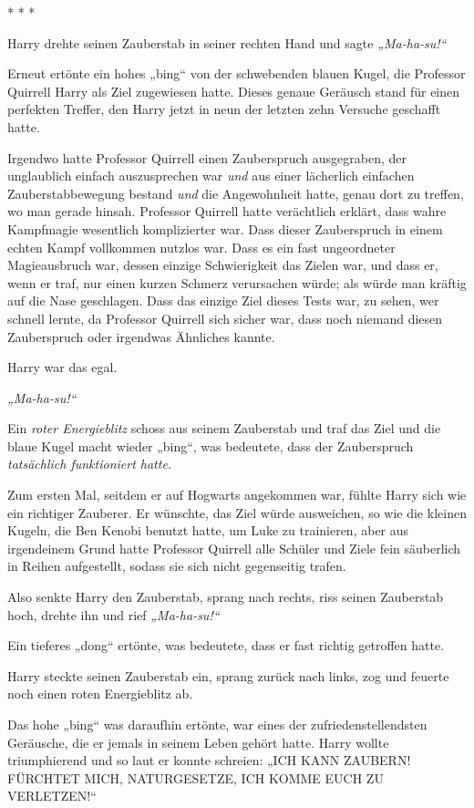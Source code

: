 {* * *

Harry drehte seinen Zauberstab in seiner rechten Hand und sagte \emph{„Ma-ha-su!“}

Erneut ertönte ein hohes „bing“ von der schwebenden blauen Kugel, die Professor Quirrell Harry als Ziel zugewiesen hatte. Dieses genaue Geräusch stand für einen perfekten Treffer, den Harry jetzt in neun der letzten zehn Versuche geschafft hatte.

Irgendwo hatte Professor Quirrell einen Zauberspruch ausgegraben, der unglaublich einfach auszusprechen war \emph{und} aus einer lächerlich einfachen Zauberstabbewegung bestand \emph{und} die Angewohnheit hatte, genau dort zu treffen, wo man gerade hinsah. Professor Quirrell hatte verächtlich erklärt, dass wahre Kampfmagie wesentlich komplizierter war. Dass dieser Zauberspruch in einem echten Kampf vollkommen nutzlos war. Dass es ein fast ungeordneter Magieausbruch war, dessen einzige Schwierigkeit das Zielen war, und dass er, wenn er traf, nur einen kurzen Schmerz verursachen würde; als würde man kräftig auf die Nase geschlagen. Dass das einzige Ziel dieses Tests war, zu sehen, wer schnell lernte, da Professor Quirrell sich sicher war, dass noch niemand diesen Zauberspruch oder irgendwas Ähnliches kannte.

Harry war das egal.

\emph{„Ma-ha-su!“}

Ein \emph{roter Energieblitz} schoss aus seinem Zauberstab und traf das Ziel und die blaue Kugel macht wieder „bing“, was bedeutete, dass der Zauberspruch \emph{tatsächlich funktioniert hatte.}

Zum ersten Mal, seitdem er auf Hogwarts angekommen war, fühlte Harry sich wie ein richtiger Zauberer. Er wünschte, das Ziel würde ausweichen, so wie die kleinen Kugeln, die Ben Kenobi benutzt hatte, um Luke zu trainieren, aber aus irgendeinem Grund hatte Professor Quirrell alle Schüler und Ziele fein säuberlich in Reihen aufgestellt, sodass sie sich nicht gegenseitig trafen.

Also senkte Harry den Zauberstab, sprang nach rechts, riss seinen Zauberstab hoch, drehte ihn und rief \emph{„Ma-ha-su!“}

Ein tieferes „dong“ ertönte, was bedeutete, dass er fast richtig getroffen hatte.

Harry steckte seinen Zauberstab ein, sprang zurück nach links, zog und feuerte noch einen roten Energieblitz ab.

Das hohe „bing“ was daraufhin ertönte, war eines der zufriedenstellendsten Geräusche, die er jemals in seinem Leben gehört hatte. Harry wollte triumphierend und so laut er konnte schreien: „ICH KANN ZAUBERN! FÜRCHTET MICH, NATURGESETZE, ICH KOMME EUCH ZU VERLETZEN!“

}
